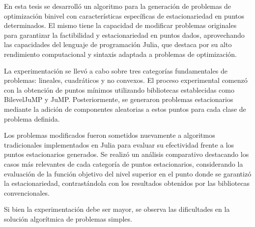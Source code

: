 \begin{conclusions}
    

    En esta tesis se desarrolló un algoritmo para la generación de problemas de optimización binivel con características específicas de estacionariedad en puntos determinados. El mismo tiene la capacidad de modificar problemas originales para garantizar la factibilidad y estacionariedad en puntos dados, aprovechando las capacidades del lenguaje de programación Julia, que destaca por su alto rendimiento computacional y sintaxis adaptada a problemas de optimización.
    
    La experimentación se llevó a cabo sobre tres categorías fundamentales de problemas: lineales, cuadráticos y no convexos. El proceso experimental comenzó con la obtención de puntos mínimos utilizando bibliotecas establecidas como BilevelJuMP y JuMP. Posteriormente, se generaron problemas estacionarios mediante la adición de componentes aleatorias a estos puntos para cada clase de problema definida.
    
    Los problemas modificados fueron sometidos nuevamente a algoritmos tradicionales implementados en Julia para evaluar su efectividad frente a los puntos estacionarios generados. Se realizó un análisis comparativo destacando los casos más relevantes de cada categoría de puntos estacionarios, considerando la evaluación de la función objetivo del nivel superior en el punto donde se garantizó la estacionariedad, contrastándola con los resultados obtenidos por las bibliotecas convencionales.
    
Si bien la experimentación debe ser mayor, se observa las dificultades en la solución algorítmica de problemas simples.

        
\end{conclusions}

